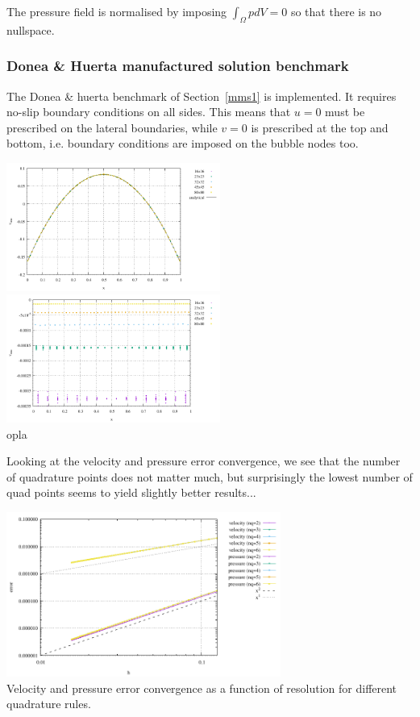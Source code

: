 The pressure field is normalised by imposing $\int_\Omega p dV=0 $ so that there is no nullspace.

\subsubsection*{Donea \& Huerta manufactured solution benchmark}

The Donea \& huerta benchmark of Section~\ref{mms1} is implemented. It requires 
no-slip boundary conditions on all sides. This means that $u=0$ must be 
prescribed on the lateral boundaries, while $v=0$ is prescribed at the top and bottom, 
i.e. boundary conditions are imposed on the bubble nodes too.

\begin{center}
\includegraphics[width=7cm]{python_codes/fieldstone_80/results/dh/pressure}
\includegraphics[width=7cm]{python_codes/fieldstone_80/results/dh/pressure_error}\\
{\captionfont  opla}
\end{center}


Looking at the velocity and pressure error convergence, we see that the number of quadrature
points does not matter much, but surprisingly the lowest number of quad points seems to yield slightly
better results...
\begin{center}
\includegraphics[width=9cm]{python_codes/fieldstone_80/results/dh/errors}\\
{\captionfont Velocity and pressure error convergence as a function of resolution for 
different quadrature rules.}
\end{center}

